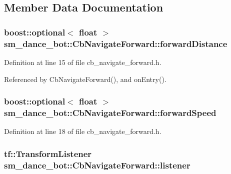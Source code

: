 \subsection{Member Data Documentation}
\subsubsection[{\texorpdfstring{forward\+Distance}{forwardDistance}}]{\setlength{\rightskip}{0pt plus 5cm}boost\+::optional$<$ float $>$ sm\+\_\+dance\+\_\+bot\+::\+Cb\+Navigate\+Forward\+::forward\+Distance}\hypertarget{classsm__dance__bot_1_1CbNavigateForward_af150b8fb72f2a27b6fef85b6f169b91b}{}\label{classsm__dance__bot_1_1CbNavigateForward_af150b8fb72f2a27b6fef85b6f169b91b}


Definition at line 15 of file cb\+\_\+navigate\+\_\+forward.\+h.



Referenced by Cb\+Navigate\+Forward(), and on\+Entry().

\subsubsection[{\texorpdfstring{forward\+Speed}{forwardSpeed}}]{\setlength{\rightskip}{0pt plus 5cm}boost\+::optional$<$ float $>$ sm\+\_\+dance\+\_\+bot\+::\+Cb\+Navigate\+Forward\+::forward\+Speed}\hypertarget{classsm__dance__bot_1_1CbNavigateForward_ab42a9f0f47c959b3fbdde4e098c646b3}{}\label{classsm__dance__bot_1_1CbNavigateForward_ab42a9f0f47c959b3fbdde4e098c646b3}


Definition at line 18 of file cb\+\_\+navigate\+\_\+forward.\+h.

\subsubsection[{\texorpdfstring{listener}{listener}}]{\setlength{\rightskip}{0pt plus 5cm}tf\+::\+Transform\+Listener sm\+\_\+dance\+\_\+bot\+::\+Cb\+Navigate\+Forward\+::listener}\hypertarget{classsm__dance__bot_1_1CbNavigateForward_a7bda457757f10a2e71eb15c07bf707b4}{}\label{classsm__dance__bot_1_1CbNavigateForward_a7bda457757f10a2e71eb15c07bf707b4}


